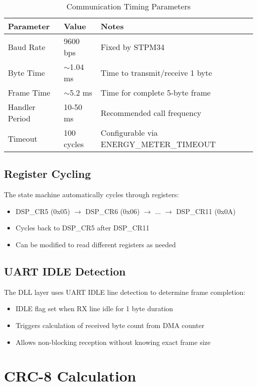 \documentclass[11pt,a4paper]{article}
\begin{document}
\begin{table}[H]
\centering
\begin{tabular}{lll}
\toprule
\textbf{Parameter} & \textbf{Value} & \textbf{Notes} \\
\midrule
Baud Rate & 9600 bps & Fixed by STPM34 \\
Byte Time & $\sim$1.04 ms & Time to transmit/receive 1 byte \\
Frame Time & $\sim$5.2 ms & Time for complete 5-byte frame \\
Handler Period & 10-50 ms & Recommended call frequency \\
Timeout & 100 cycles & Configurable via ENERGY\_METER\_TIMEOUT \\
\bottomrule
\end{tabular}
\caption{Communication Timing Parameters}
\label{tab:timing}
\end{table}

\subsection{Register Cycling}

The state machine automatically cycles through registers:
\begin{itemize}[noitemsep]
    \item DSP\_CR5 (0x05) $\rightarrow$ DSP\_CR6 (0x06) $\rightarrow$ ... $\rightarrow$ DSP\_CR11 (0x0A)
    \item Cycles back to DSP\_CR5 after DSP\_CR11
    \item Can be modified to read different registers as needed
\end{itemize}

\subsection{UART IDLE Detection}

The DLL layer uses UART IDLE line detection to determine frame completion:
\begin{itemize}[noitemsep]
    \item IDLE flag set when RX line idle for 1 byte duration
    \item Triggers calculation of received byte count from DMA counter
    \item Allows non-blocking reception without knowing exact frame size
\end{itemize}

\section{CRC-8 Calculation}
\end{document}

